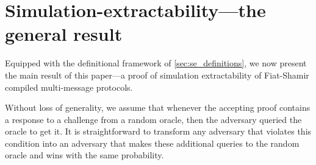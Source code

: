 \section{Simulation-extractability---the general result}
\label{sec:general}
Equipped with the definitional framework of \cref{sec:se_definitions}, we now present the
main result of this paper---a proof of simulation extractability of
Fiat-Shamir compiled multi-message protocols.





Without loss of generality, we assume that whenever the accepting proof contains a
response to a challenge from a random oracle, then the adversary queried the oracle
to get it. It is straightforward to transform any adversary that violates this
condition into an adversary that makes these additional queries to the random oracle
and wins with the same probability.

